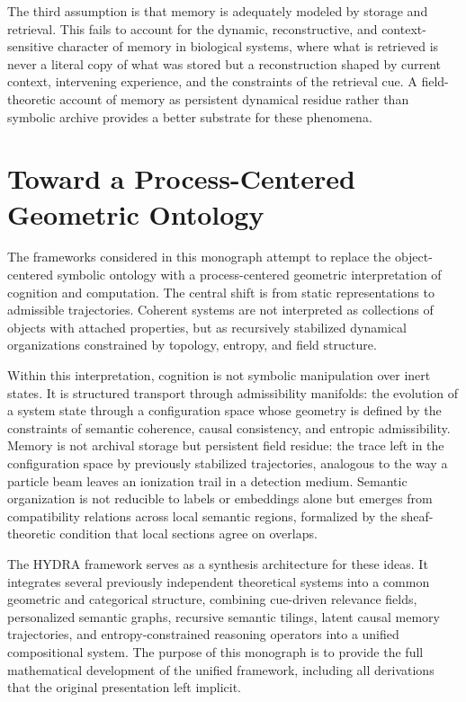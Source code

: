 \documentclass[12pt, a4paper, openany]{book}
\theoremstyle{plain}
\theoremstyle{definition}
\theoremstyle{remark}
\begin{document}
The third assumption is that memory is adequately modeled by storage and retrieval. This fails to account for the dynamic, reconstructive, and context-sensitive character of memory in biological systems, where what is retrieved is never a literal copy of what was stored but a reconstruction shaped by current context, intervening experience, and the constraints of the retrieval cue. A field-theoretic account of memory as persistent dynamical residue rather than symbolic archive provides a better substrate for these phenomena.

\section{Toward a Process-Centered Geometric Ontology}

The frameworks considered in this monograph attempt to replace the object-centered symbolic ontology with a process-centered geometric interpretation of cognition and computation. The central shift is from static representations to admissible trajectories. Coherent systems are not interpreted as collections of objects with attached properties, but as recursively stabilized dynamical organizations constrained by topology, entropy, and field structure.

Within this interpretation, cognition is not symbolic manipulation over inert states. It is structured transport through admissibility manifolds: the evolution of a system state through a configuration space whose geometry is defined by the constraints of semantic coherence, causal consistency, and entropic admissibility. Memory is not archival storage but persistent field residue: the trace left in the configuration space by previously stabilized trajectories, analogous to the way a particle beam leaves an ionization trail in a detection medium. Semantic organization is not reducible to labels or embeddings alone but emerges from compatibility relations across local semantic regions, formalized by the sheaf-theoretic condition that local sections agree on overlaps.

The HYDRA framework serves as a synthesis architecture for these ideas. It integrates several previously independent theoretical systems into a common geometric and categorical structure, combining cue-driven relevance fields, personalized semantic graphs, recursive semantic tilings, latent causal memory trajectories, and entropy-constrained reasoning operators into a unified compositional system. The purpose of this monograph is to provide the full mathematical development of the unified framework, including all derivations that the original presentation left implicit.
\end{document}
